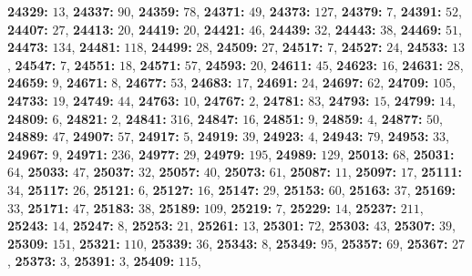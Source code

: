 \textsf{\bfseries 24329:} $13$, \textsf{\bfseries 24337:} $90$, \textsf{\bfseries 24359:} $78$, \textsf{\bfseries 24371:} $49$, \textsf{\bfseries 24373:} $127$, \textsf{\bfseries 24379:} $7$, \textsf{\bfseries 24391:} $52$, \textsf{\bfseries 24407:} $27$, \textsf{\bfseries 24413:} $20$, \textsf{\bfseries 24419:} $20$, \textsf{\bfseries 24421:} $46$, \textsf{\bfseries 24439:} $32$, \textsf{\bfseries 24443:} $38$, \textsf{\bfseries 24469:} $51$, \textsf{\bfseries 24473:} $134$, \textsf{\bfseries 24481:} $118$, \textsf{\bfseries 24499:} $28$, \textsf{\bfseries 24509:} $27$, \textsf{\bfseries 24517:} $7$, \textsf{\bfseries 24527:} $24$, \textsf{\bfseries 24533:} $13$, \textsf{\bfseries 24547:} $7$, \textsf{\bfseries 24551:} $18$, \textsf{\bfseries 24571:} $57$, \textsf{\bfseries 24593:} $20$, \textsf{\bfseries 24611:} $45$, \textsf{\bfseries 24623:} $16$, \textsf{\bfseries 24631:} $28$, \textsf{\bfseries 24659:} $9$, \textsf{\bfseries 24671:} $8$, \textsf{\bfseries 24677:} $53$, \textsf{\bfseries 24683:} $17$, \textsf{\bfseries 24691:} $24$, \textsf{\bfseries 24697:} $62$, \textsf{\bfseries 24709:} $105$, \textsf{\bfseries 24733:} $19$, \textsf{\bfseries 24749:} $44$, \textsf{\bfseries 24763:} $10$, \textsf{\bfseries 24767:} $2$, \textsf{\bfseries 24781:} $83$, \textsf{\bfseries 24793:} $15$, \textsf{\bfseries 24799:} $14$, \textsf{\bfseries 24809:} $6$, \textsf{\bfseries 24821:} $2$, \textsf{\bfseries 24841:} $316$, \textsf{\bfseries 24847:} $16$, \textsf{\bfseries 24851:} $9$, \textsf{\bfseries 24859:} $4$, \textsf{\bfseries 24877:} $50$, \textsf{\bfseries 24889:} $47$, \textsf{\bfseries 24907:} $57$, \textsf{\bfseries 24917:} $5$, \textsf{\bfseries 24919:} $39$, \textsf{\bfseries 24923:} $4$, \textsf{\bfseries 24943:} $79$, \textsf{\bfseries 24953:} $33$, \textsf{\bfseries 24967:} $9$, \textsf{\bfseries 24971:} $236$, \textsf{\bfseries 24977:} $29$, \textsf{\bfseries 24979:} $195$, \textsf{\bfseries 24989:} $129$, \textsf{\bfseries 25013:} $68$, \textsf{\bfseries 25031:} $64$, \textsf{\bfseries 25033:} $47$, \textsf{\bfseries 25037:} $32$, \textsf{\bfseries 25057:} $40$, \textsf{\bfseries 25073:} $61$, \textsf{\bfseries 25087:} $11$, \textsf{\bfseries 25097:} $17$, \textsf{\bfseries 25111:} $34$, \textsf{\bfseries 25117:} $26$, \textsf{\bfseries 25121:} $6$, \textsf{\bfseries 25127:} $16$, \textsf{\bfseries 25147:} $29$, \textsf{\bfseries 25153:} $60$, \textsf{\bfseries 25163:} $37$, \textsf{\bfseries 25169:} $33$, \textsf{\bfseries 25171:} $47$, \textsf{\bfseries 25183:} $38$, \textsf{\bfseries 25189:} $109$, \textsf{\bfseries 25219:} $7$, \textsf{\bfseries 25229:} $14$, \textsf{\bfseries 25237:} $211$, \textsf{\bfseries 25243:} $14$, \textsf{\bfseries 25247:} $8$, \textsf{\bfseries 25253:} $21$, \textsf{\bfseries 25261:} $13$, \textsf{\bfseries 25301:} $72$, \textsf{\bfseries 25303:} $43$, \textsf{\bfseries 25307:} $39$, \textsf{\bfseries 25309:} $151$, \textsf{\bfseries 25321:} $110$, \textsf{\bfseries 25339:} $36$, \textsf{\bfseries 25343:} $8$, \textsf{\bfseries 25349:} $95$, \textsf{\bfseries 25357:} $69$, \textsf{\bfseries 25367:} $27$, \textsf{\bfseries 25373:} $3$, \textsf{\bfseries 25391:} $3$, \textsf{\bfseries 25409:} $115$, 
